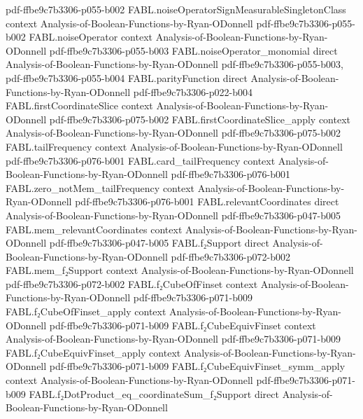 \begin{theorem}
  {pdf-ffbe9c7b3306-p055-b002}
\proofstep
  {FABL.noiseOperatorSignMeasurableSingletonClass}
  {context}
  {Analysis-of-Boolean-Functions-by-Ryan-ODonnell}
  {pdf-ffbe9c7b3306-p055-b002}
\proofstep
  {FABL.noiseOperator}
  {context}
  {Analysis-of-Boolean-Functions-by-Ryan-ODonnell}
  {pdf-ffbe9c7b3306-p055-b003}
\proofstep
  {FABL.noiseOperator_monomial}
  {direct}
  {Analysis-of-Boolean-Functions-by-Ryan-ODonnell}
  {pdf-ffbe9c7b3306-p055-b003,
    pdf-ffbe9c7b3306-p055-b004}
\proofstep
  {FABL.parityFunction}
  {direct}
  {Analysis-of-Boolean-Functions-by-Ryan-ODonnell}
  {pdf-ffbe9c7b3306-p022-b004}
\proofstep
  {FABL.firstCoordinateSlice}
  {context}
  {Analysis-of-Boolean-Functions-by-Ryan-ODonnell}
  {pdf-ffbe9c7b3306-p075-b002}
\proofstep
  {FABL.firstCoordinateSlice_apply}
  {context}
  {Analysis-of-Boolean-Functions-by-Ryan-ODonnell}
  {pdf-ffbe9c7b3306-p075-b002}
\proofstep
  {FABL.tailFrequency}
  {context}
  {Analysis-of-Boolean-Functions-by-Ryan-ODonnell}
  {pdf-ffbe9c7b3306-p076-b001}
\proofstep
  {FABL.card_tailFrequency}
  {context}
  {Analysis-of-Boolean-Functions-by-Ryan-ODonnell}
  {pdf-ffbe9c7b3306-p076-b001}
\proofstep
  {FABL.zero_notMem_tailFrequency}
  {context}
  {Analysis-of-Boolean-Functions-by-Ryan-ODonnell}
  {pdf-ffbe9c7b3306-p076-b001}
\proofstep
  {FABL.relevantCoordinates}
  {direct}
  {Analysis-of-Boolean-Functions-by-Ryan-ODonnell}
  {pdf-ffbe9c7b3306-p047-b005}
\proofstep
  {FABL.mem_relevantCoordinates}
  {context}
  {Analysis-of-Boolean-Functions-by-Ryan-ODonnell}
  {pdf-ffbe9c7b3306-p047-b005}
\proofstep
  {FABL.f₂Support}
  {direct}
  {Analysis-of-Boolean-Functions-by-Ryan-ODonnell}
  {pdf-ffbe9c7b3306-p072-b002}
\proofstep
  {FABL.mem_f₂Support}
  {context}
  {Analysis-of-Boolean-Functions-by-Ryan-ODonnell}
  {pdf-ffbe9c7b3306-p072-b002}
\proofstep
  {FABL.f₂CubeOfFinset}
  {context}
  {Analysis-of-Boolean-Functions-by-Ryan-ODonnell}
  {pdf-ffbe9c7b3306-p071-b009}
\proofstep
  {FABL.f₂CubeOfFinset_apply}
  {context}
  {Analysis-of-Boolean-Functions-by-Ryan-ODonnell}
  {pdf-ffbe9c7b3306-p071-b009}
\proofstep
  {FABL.f₂CubeEquivFinset}
  {context}
  {Analysis-of-Boolean-Functions-by-Ryan-ODonnell}
  {pdf-ffbe9c7b3306-p071-b009}
\proofstep
  {FABL.f₂CubeEquivFinset_apply}
  {context}
  {Analysis-of-Boolean-Functions-by-Ryan-ODonnell}
  {pdf-ffbe9c7b3306-p071-b009}
\proofstep
  {FABL.f₂CubeEquivFinset_symm_apply}
  {context}
  {Analysis-of-Boolean-Functions-by-Ryan-ODonnell}
  {pdf-ffbe9c7b3306-p071-b009}
\proofstep
  {FABL.f₂DotProduct_eq_coordinateSum_f₂Support}
  {direct}
  {Analysis-of-Boolean-Functions-by-Ryan-ODonnell}

\end{theorem}
